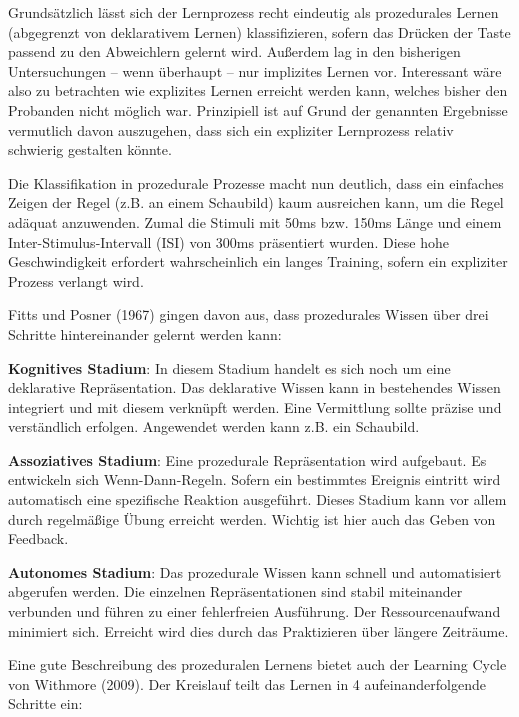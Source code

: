 \documentclass[doc,a4paper,12pt]{apa6}
\begin{document}
Grundsätzlich lässt sich der Lernprozess recht eindeutig als prozedurales Lernen (abgegrenzt von deklarativem Lernen) klassifizieren, sofern das Drücken der Taste passend zu den Abweichlern gelernt wird. Außerdem lag in den bisherigen Untersuchungen – wenn überhaupt – nur implizites Lernen vor. Interessant wäre also zu betrachten wie explizites Lernen erreicht werden kann, welches bisher den Probanden nicht möglich war. Prinzipiell ist auf Grund der genannten Ergebnisse vermutlich davon auszugehen, dass sich ein expliziter Lernprozess relativ schwierig gestalten könnte.

Die Klassifikation in prozedurale Prozesse macht nun deutlich, dass ein einfaches Zeigen der Regel (z.B. an einem Schaubild) kaum ausreichen kann, um die Regel adäquat anzuwenden. Zumal die Stimuli mit 50ms bzw. 150ms Länge und einem Inter-Stimulus-Intervall (ISI) von 300ms präsentiert wurden. Diese hohe Geschwindigkeit erfordert wahrscheinlich ein langes Training, sofern ein expliziter Prozess verlangt wird.

Fitts und Posner (1967) gingen davon aus, dass prozedurales Wissen über drei Schritte hintereinander gelernt werden kann:

\begin{compactenum}
  \item \textbf{Kognitives Stadium}: In diesem Stadium handelt es sich noch um eine deklarative Repräsentation. Das deklarative Wissen kann in bestehendes Wissen integriert und mit diesem verknüpft werden. Eine Vermittlung sollte präzise und verständlich erfolgen. Angewendet werden kann z.B. ein Schaubild.
  \item \textbf{Assoziatives Stadium}: Eine prozedurale Repräsentation wird aufgebaut. Es entwickeln sich Wenn-Dann-Regeln. Sofern ein bestimmtes Ereignis eintritt wird automatisch eine spezifische Reaktion ausgeführt. Dieses Stadium kann vor allem durch regelmäßige Übung erreicht werden. Wichtig ist hier auch das Geben von Feedback.
  \item \textbf{Autonomes Stadium}: Das prozedurale Wissen kann schnell und automatisiert abgerufen werden. Die einzelnen Repräsentationen sind stabil miteinander verbunden und führen zu einer fehlerfreien Ausführung. Der Ressourcenaufwand minimiert sich. Erreicht wird dies durch das Praktizieren über längere Zeiträume.
\end{compactenum}

Eine gute Beschreibung des prozeduralen Lernens bietet auch der Learning Cycle von Withmore (2009). Der Kreislauf teilt das Lernen in 4 aufeinanderfolgende Schritte ein:
\end{document}
